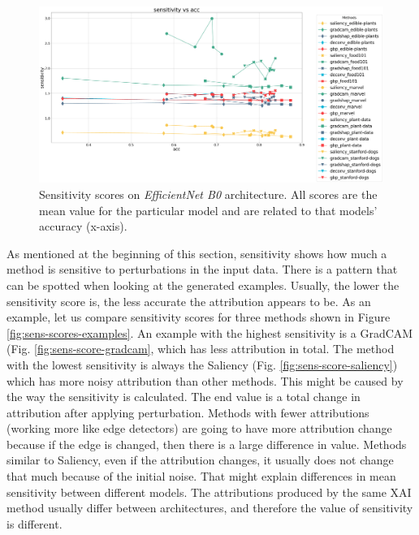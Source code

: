 \begin{figure}[ht]
  \centering
    \centering
    \includegraphics[width=\textwidth]{results/metrics/efficientnet-sensitivity vs acc.png}
    \caption{Sensitivity scores on \textit{EfficientNet B0} architecture. All scores are the mean value for the particular model and are related to that models' accuracy (x-axis).}\label{fig:efficientnet-sens}
\end{figure}

As mentioned at the beginning of this section, sensitivity shows how much a method is sensitive to perturbations in the input data. There is a pattern that can be spotted when looking at the generated examples. Usually, the lower the sensitivity score is, the less accurate the attribution appears to be. As an example, let us compare sensitivity scores for three methods shown in Figure \ref{fig:sens-scores-examples}. An example with the highest sensitivity is a GradCAM (Fig. \ref{fig:sens-score-gradcam}, which has less attribution in total. The method with the lowest sensitivity is always the Saliency (Fig. \ref{fig:sens-score-saliency}) which has more noisy attribution than other methods. This might be caused by the way the sensitivity is calculated. The end value is a total change in attribution after applying perturbation. Methods with fewer attributions (working more like edge detectors) are going to have more attribution change because if the edge is changed, then there is a large difference in value. Methods similar to Saliency, even if the attribution changes, it usually does not change that much because of the initial noise. That might explain differences in mean sensitivity between different models. The attributions produced by the same XAI method usually differ between architectures, and therefore the value of sensitivity is different.

